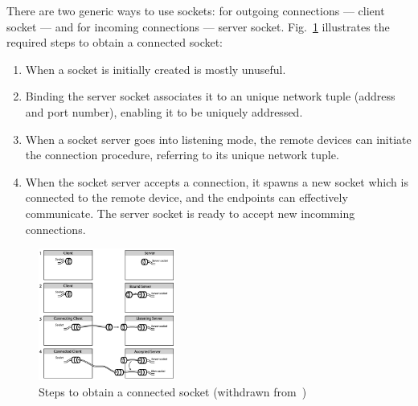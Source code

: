There are two generic ways to use sockets: for outgoing connections --- client
socket --- and for incoming connections --- server
socket. Fig.~\ref{fig:sockets-connection} illustrates the required steps to
obtain a connected socket:
\begin{enumerate}
\item When a socket is initially created is mostly unuseful.
\item Binding the server socket associates it to an unique network tuple (address and
  port number), enabling it to be uniquely addressed.
\item When a socket server goes into listening mode, the remote devices can
  initiate the connection procedure, referring to its unique network tuple.
\item When the socket server accepts a connection, it spawns a new socket which
  is connected to the remote device, and the endpoints can effectively
  communicate. The server socket is ready to accept new incomming connections.
\end{enumerate}
\newpage
\begin{figure}[!hbt]
\centering
    \includegraphics[width=0.4\textwidth]{./img/sockets-connection.png}
  \caption{Steps to obtain a connected socket (withdrawn from~\cite{huang2007bluetooth})}%
\label{fig:sockets-connection}
\end{figure}
%
